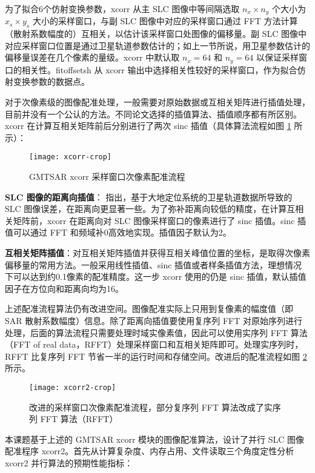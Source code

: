 为了拟合6个仿射变换参数，xcorr 从主 SLC 图像中等间隔选取 $n_x \times n_y $ 个大小为 $x_s \times y_s$ 大小的采样窗口，与副 SLC 图像中对应的采样窗口通过 FFT 方法计算（散射系数幅度的）互相关，以估计该采样窗口处图像的偏移量。副 SLC 图像中对应采样窗口位置是通过卫星轨道参数估计的；如上一节所说，用卫星参数估计的偏移量误差在几个像素的量级。xcorr 中默认取 $n_x=64$ 和 $n_y=64$ 以保证采样窗口的相关性。fitoffsetsh 从 xcorr 输出中选择相关性较好的采样窗口，作为拟合仿射变换参数的数据点。

对于次像素级的图像配准处理，一般需要对原始数据或互相关矩阵进行插值处理，目前并没有一个公认的方法。不同论文选择的插值算法、插值顺序都有所区别\cite{li2008image}\cite{hanssen1999evaluation}。xcorr 在计算互相关矩阵前后分别进行了两次 sinc 插值（具体算法流程如图 \ref{fig:xcorr} 所示）：

\begin{figure}[htbp]
\centering
\texttt{[image: xcorr-crop]}
\caption{GMTSAR xcorr 采样窗口次像素配准流程} \label{fig:xcorr}
\end{figure}

\textbf{SLC 图像的距离向插值}：\citet{sandwell2011gmtsar} 指出，基于大地定位系统的卫星轨道数据所导致的 SLC 图像误差，在距离向更显著一些。为了弥补距离向较低的精度，在计算互相关矩阵前，xcorr 在距离向对 SLC 图像采样窗口的像素进行了 sinc 插值。sinc 插值可以通过 FFT 和频域补0高效地实现。插值因子默认为2。

\textbf{互相关矩阵插值}：对互相关矩阵插值并获得互相关峰值位置的坐标，是取得次像素偏移量的常用方法。一般采用线性插值、sinc 插值或者样条插值方法，理想情况下可以达到约0.1像素的配准精度\cite{li2008image}。这一步 xcorr 使用的仍是 sinc 插值，默认插值因子在方位向和距离向均为16。

上述配准流程算法仍有改进空间。图像配准实际上只用到复像素的幅度值（即 SAR 散射系数幅度）信息。除了距离向插值要使用复序列 FFT 对原始序列进行处理，后面的算法流程只需要处理时域实像素值，因此可以使用实序列 FFT 算法（FFT of real data，RFFT）处理采样窗口和互相关矩阵即可。处理实序列时，RFFT 比复序列 FFT 节省一半的运行时间和存储空间。改进后的配准流程如图 \ref{fig:xcorr2} 所示。


\begin{figure}[htbp]
\centering
\texttt{[image: xcorr2-crop]}
\caption{改进的采样窗口次像素配准流程，部分复序列 FFT 算法改成了实序列 FFT 算法（RFFT）} \label{fig:xcorr2}
\end{figure}


本课题基于上述的 GMTSAR xcorr 模块的图像配准算法，设计了并行 SLC 图像配准程序 xcorr2。首先从计算复杂度、内存占用、文件读取三个角度定性分析 xcorr2 并行算法的预期性能指标：

